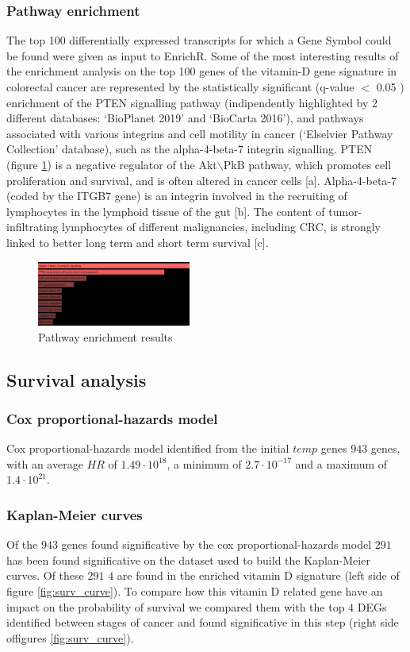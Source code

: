 \documentclass[fleqn,10pt]{SelfArx} %
\begin{document}
		\subsubsection{Pathway enrichment}
		The top 100 differentially expressed transcripts for which a Gene Symbol could be found were given as input to EnrichR.
		Some of the most interesting results of the enrichment analysis on the top 100 genes of the vitamin-D gene signature in colorectal cancer are represented by the statistically significant (q-value $<$ 0.05 ) enrichment of the PTEN signalling pathway (indipendently highlighted by 2 different databases: ‘BioPlanet 2019’ and ‘BioCarta 2016’), and pathways associated with various integrins and cell motility in cancer (‘Elselvier Pathway Collection’ database), such as the alpha-4-beta-7 integrin signalling.
PTEN (figure \ref{fig:pten}) is a negative regulator of the Akt$\backslash$PkB pathway, which promotes cell proliferation and survival, and is often altered in cancer cells [a].
Alpha-4-beta-7 (coded by the ITGB7 gene) is an integrin involved in the recruiting of lymphocytes in the lymphoid tissue of the gut [b].
The content of tumor-infiltrating lymphocytes of different malignancies, including CRC, is strongly linked to better long term and short term survival [c].


		\begin{figure}[ht]
			\includegraphics[width=0.45\textwidth]{figures/pten.png}
			\caption{Pathway enrichment results}
			\label{fig:pten}
		\end{figure}

	\subsection{Survival analysis}

		\subsubsection{Cox proportional-hazards model}
		Cox proportional-hazards model identified from the initial $temp$ genes $943$ genes, with an average $HR$ of $1.49\cdot 10^{18}$, a minimum of $2.7\cdot 10^{-17}$ and a maximum of $1.4\cdot 10^{21}$.

		\subsubsection{Kaplan-Meier curves}
		Of the $943$ genes found significative by the cox proportional-hazards model $291$ has been found significative on the dataset used to build the Kaplan-Meier curves.
		Of these $291$ $4$ are found in the enriched vitamin D signature (left side of figure \ref{fig:surv_curve}).
		To compare how this vitamin D related gene have an impact on the probability of survival we compared them with the top $4$ DEGs identified between stages of cancer and found significative in this step (right side offigures \ref{fig:surv_curve}).
\end{document}
